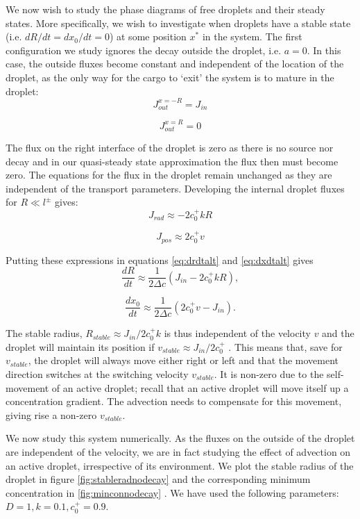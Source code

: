 \documentclass{Dissertate}
\begin{document}
We now wish to study the phase diagrams of free droplets and their
steady states. More specifically, we wish to investigate when droplets
have a stable state (i.e. \(dR/dt=dx_0/dt=0\)) at some position \(x^*\)
in the system. The first configuration we study ignores the decay
outside the droplet, i.e. \(a=0\). In this case, the outside fluxes
become constant and independent of the location of the droplet, as the
only way for the cargo to `exit' the system is to mature in the droplet:
\[
J_{out}^{x=-R} = J_{in}
\]

\[
J_{out}^{x=R} =0
\]

The flux on the right interface of the droplet is zero as there is no
source nor decay and in our quasi-steady state approximation the flux
then must become zero. The equations for the flux in the droplet remain
unchanged as they are independent of the transport parameters.
Developing the internal droplet fluxes for \(R\ll l^\pm\) gives:
\begin{equation}
J_{rad}\approx -2 c_0^+kR
\label{eq:jrad}\end{equation}

\begin{equation}
J_{pos}\approx2 c_0^+v 
\label{eq:posfluxapprox}\end{equation}

Putting these expressions in equations \ref{eq:drdtalt} and
\ref{eq:dxdtalt} gives \begin{equation}
\frac{dR}{dt} \approx \frac{1}{2\Delta c}(J_{in}-2 c_0^+kR),
\label{eq:drdtapproxnodecay}\end{equation}

\[
\frac{dx_0}{dt} \approx \frac{1}{2\Delta c}(2 c_0^+v-J_{in}).
\]

The stable radius, \(R_{stable} \approx J_{in}/2c_0^+k\) is thus
independent of the velocity \(v\) and the droplet will maintain its
position if \(v_{stable}\approx J_{in}/2c_0^+\) . This means that, save
for \(v_{stable}\), the droplet will always move either right or left
and that the movement direction switches at the switching velocity
\(v_{stable}\). It is non-zero due to the self-movement of an active
droplet; recall that an active droplet will move itself up a
concentration gradient. The advection needs to compensate for this
movement, giving rise a non-zero \(v_{stable}\).

We now study this system numerically. As the fluxes on the outside of
the droplet are independent of the velocity, we are in fact studying the
effect of advection on an active droplet, irrespective of its
environment. We plot the stable radius of the droplet in figure
\ref{fig:stableradnodecay} and the corresponding minimum
concentration in \ref{fig:minconnodecay} . We have used the
following parameters: \(D=1, k=0.1, c_0^+=0.9\).
\end{document}
